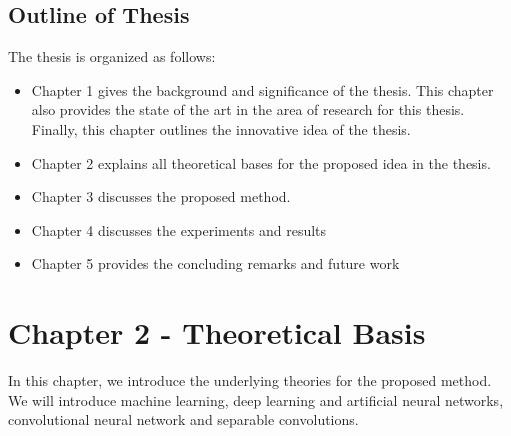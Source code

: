 \documentclass[master]{thesis-uestc}
\begin{document}
\section{Outline of Thesis}
The thesis is organized as follows:
\begin{itemize}
    \item Chapter 1 gives the background and significance of the thesis. This chapter also provides the state of the art in the area of research for this thesis. Finally, this chapter outlines the innovative idea of the thesis.
    \item Chapter 2 explains all theoretical bases for the proposed idea in the thesis.
    \item Chapter 3 discusses the proposed method.
    \item Chapter 4 discusses the experiments and results
    \item Chapter 5 provides the concluding remarks and future work
\end{itemize}


\chapter{Chapter 2 - Theoretical Basis}
In this chapter, we introduce the underlying theories for the proposed method. We will introduce machine learning, deep learning and artificial neural networks, convolutional neural network and separable convolutions.
\end{document}
